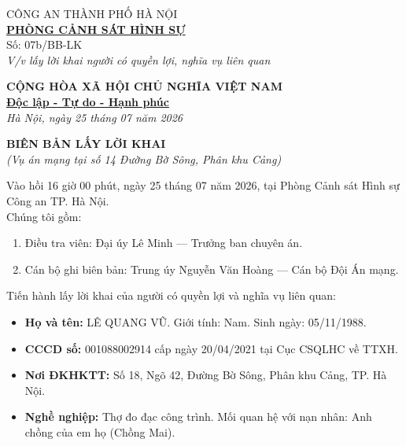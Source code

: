 \documentclass[12pt,a4paper]{article}
\begin{document}
\noindent
\begin{minipage}[t]{0.45\textwidth}
    \begin{center}
        \small
        CÔNG AN THÀNH PHỐ HÀ NỘI\\
        \textbf{\underline{PHÒNG CẢNH SÁT HÌNH SỰ}}\\[0.1cm]
        Số: 07b/BB-LK\\
        \textit{V/v lấy lời khai người có quyền lợi, nghĩa vụ liên quan}
    \end{center}
\end{minipage}
\hfill
\begin{minipage}[t]{0.52\textwidth}
    \begin{center}
        \small
        \textbf{CỘNG HÒA XÃ HỘI CHỦ NGHĨA VIỆT NAM}\\
        \textbf{\underline{Độc lập - Tự do - Hạnh phúc}}\\[0.1cm]
        \textit{Hà Nội, ngày 25 tháng 07 năm 2026}
    \end{center}
\end{minipage}

\vspace{0.6cm}

\begin{center}
    \textbf{\large BIÊN BẢN LẤY LỜI KHAI}\\
    \textit{(Vụ án mạng tại số 14 Đường Bờ Sông, Phân khu Cảng)}
\end{center}

\vspace{0.3cm}

\noindent Vào hồi 16 giờ 00 phút, ngày 25 tháng 07 năm 2026, tại Phòng Cảnh sát Hình sự Công an TP. Hà Nội.\\
Chúng tôi gồm:
\begin{enumerate}[label=\arabic*., leftmargin=1.5cm]
    \item Điều tra viên: Đại úy Lê Minh — Trưởng ban chuyên án.
    \item Cán bộ ghi biên bản: Trung úy Nguyễn Văn Hoàng — Cán bộ Đội Án mạng.
\end{enumerate}

\noindent Tiến hành lấy lời khai của người có quyền lợi và nghĩa vụ liên quan:
\begin{itemize}[leftmargin=1.5cm]
    \item \textbf{Họ và tên:} LÊ QUANG VŨ. Giới tính: Nam. Sinh ngày: 05/11/1988.
    \item \textbf{CCCD số:} 001088002914 cấp ngày 20/04/2021 tại Cục CSQLHC về TTXH.
    \item \textbf{Nơi ĐKHKTT:} Số 18, Ngõ 42, Đường Bờ Sông, Phân khu Cảng, TP. Hà Nội.
    \item \textbf{Nghề nghiệp:} Thợ đo đạc công trình. Mối quan hệ với nạn nhân: Anh chồng của em họ (Chồng Mai).
\end{itemize}
\end{document}
